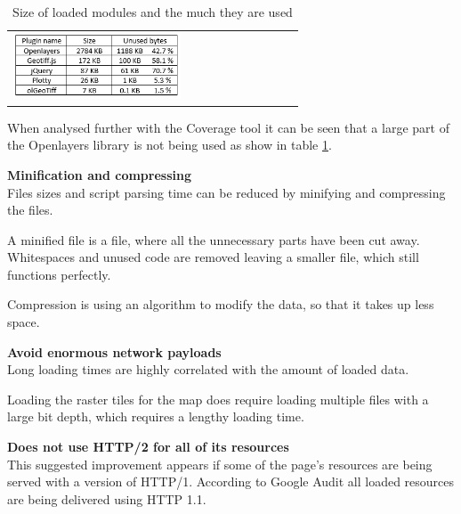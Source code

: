 
\begin{table}[htbp]
	\centering
	\begin{tabular}{l}
		\includegraphics[width=0.6\textwidth]{Pictures/tabPluginSize}
	\end{tabular}
	\caption{Size of loaded modules and the much they are used}
	\label{tabPluginSize}
\end{table}

When analysed further with the Coverage tool it can be seen that a large part of the Openlayers library is not being used as show in table \ref{tabPluginSize}.  


\textbf{Minification and compressing}\\
Files sizes and script parsing time can be reduced by minifying and compressing the files. 

A minified file is a file, where all the unnecessary parts have been cut away. Whitespaces and unused code are removed leaving a smaller file, which still functions perfectly. 

Compression is using an algorithm to modify the data, so that it takes up less space.
\citep{MinifyJS}

\textbf{Avoid enormous network payloads}\\
Long loading times are highly correlated with the amount of loaded data.  
\citep{LoadingTooMuch}

Loading the raster tiles for the map does require loading multiple files with a large bit depth, which requires a lengthy loading time. 

\textbf{Does not use HTTP/2 for all of its resources}\\
This suggested improvement appears if some of the page’s resources are being served with a version of HTTP/1. According to Google Audit all loaded resources are being delivered using HTTP 1.1.

